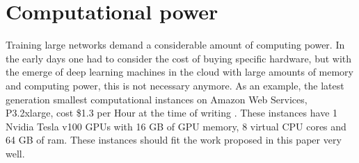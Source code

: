 \section{Computational power}
Training large networks demand a considerable amount of computing power. In the early days one had to consider the cost of buying specific hardware, but with the emerge of deep learning machines in the cloud with large amounts of memory and computing power, this is not necessary anymore. As an example, the latest generation smallest computational instances on Amazon Web Services, P3.2xlarge, cost \$1.3 per Hour at the time of writing \cite{Amazon2017}. These instances have 1 Nvidia Tesla v100 GPUs with 16 GB of GPU memory, 8 virtual CPU cores and 64 GB of ram. These instances should fit the work proposed in this paper very well.